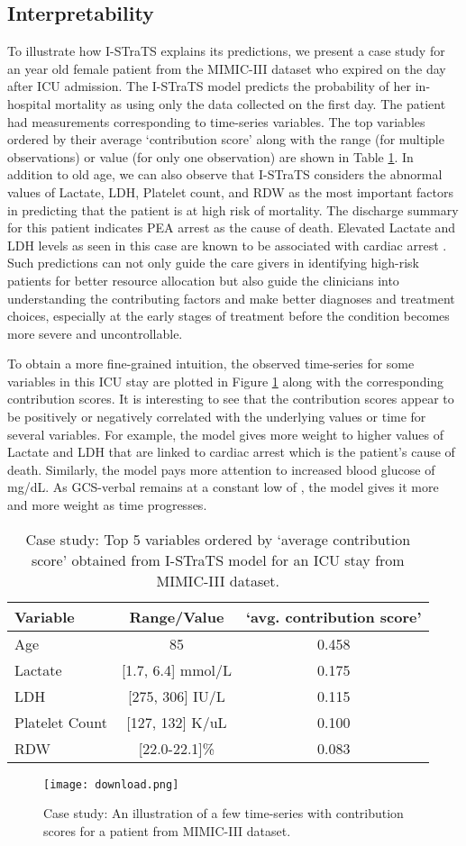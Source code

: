 \subsection{Interpretability}
To illustrate how I-STraTS explains its predictions, we present a case study for an  year old female patient from the MIMIC-III dataset who expired on the  day after ICU admission. The I-STraTS model predicts the probability of her in-hospital mortality as  using only the data collected on the first day. The patient had  measurements corresponding to  time-series variables. The top  variables ordered by their average `contribution score' along with the range (for multiple observations)  or value (for only one observation) are shown in Table \ref{tab:interp}. In addition to old age, we can also observe that I-STraTS considers the abnormal values of Lactate, LDH, Platelet count, and RDW as the most important factors in predicting that the patient is at high risk of mortality. The discharge summary for this patient indicates PEA arrest as the cause of death. Elevated Lactate and LDH levels as seen in this case are known to be associated with cardiac arrest \citep{dell2017prognostic, farhana2021biochemistry}.
Such predictions can not only guide the care givers in identifying high-risk patients for better resource allocation but also guide the clinicians into understanding the contributing factors and make better diagnoses and treatment choices, especially at the early stages of treatment before the condition becomes more severe and uncontrollable.

To obtain a more fine-grained intuition, the observed time-series for some variables in this ICU stay are plotted in Figure \ref{fig:interp} along with the corresponding contribution scores. It is interesting to see that the contribution scores appear to be positively or negatively correlated with the underlying values or time for several variables. For example, the model gives more weight to higher values of Lactate and LDH that are linked to cardiac arrest which is the patient's cause of death. Similarly, the model pays more attention to increased blood glucose of  mg/dL. As GCS-verbal remains at a constant low of , the model gives it more and more weight as time progresses. 


\begin{table}[]
\centering
\caption{Case study: Top 5 variables ordered by `average contribution score' obtained from I-STraTS model for an ICU stay from MIMIC-III dataset.}
\label{tab:interp}
\begin{tabular}{lcc}
\toprule
Variable &Range/Value &`avg. contribution score' \\
\midrule
Age &85 &0.458 \\
Lactate &[1.7, 6.4] mmol/L &0.175 \\
LDH &[275, 306] IU/L &0.115 \\
Platelet Count &[127, 132] K/uL &0.100 \\
RDW &[22.0-22.1]\% &0.083 \\
\bottomrule
    \end{tabular}
\end{table}

\begin{figure}
    \centering
    \texttt{[image: download.png]}
    \caption{Case study: An illustration of a few time-series with contribution scores for a patient from MIMIC-III dataset.}
    \label{fig:interp}
\end{figure}
